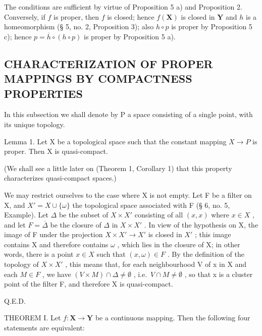 The conditions are sufficient by virtue of Proposition 5 a) and Proposition 2. Conversely, if \(f\) is proper, then \(f\) is closed; hence \(f(\mathbf{X})\) is closed in \(\mathbf{Y}\) and \(h\) is a homeomorphism (§ 5, no. 2, Proposition 3); also \(h \circ p\) is proper by Proposition 5 c); hence \(p = \overline{h} \circ (h \circ p)\) is proper by Proposition 5 a).

\subsection{CHARACTERIZATION OF PROPER MAPPINGS BY COMPACTNESS PROPERTIES}

In this subsection we shall denote by P a space consisting of a single point, with its unique topology.

Lemma 1. Let X be a topological space such that the constant mapping \(X \rightarrow P\) is proper. Then X is quasi-compact.

(We shall see a little later on (Theorem 1, Corollary 1) that this property characterizes quasi-compact spaces.)

We may restrict ourselves to the case where X is not empty. Let F be a filter on X, and \(X' = X \cup \{\omega\}\) the topological space associated with F (§ 6, no. 5, Example). Let \(\Delta\) be the subset of \(X \times X'\) consisting of all \((x, x)\) where \(x \in X\) , and let \(F = \overline{\Delta}\) be the closure of \(\Delta\) in \(X \times X'\) . In view of the hypothesis on X, the image of F under the projection \(X \times X' \to X'\) is closed in \(X'\) ; this image contains X and therefore contains \(\omega\) , which lies in the closure of X; in other words, there is a point \(x \in X\) such that \((x, \omega) \in F\) . By the definition of the topology of \(X \times X'\) , this means that, for each neighbourhood V of x in X and each \(M \in F\) , we have \((V \times M) \cap \Delta \neq \emptyset\) , i.e.~\(V \cap M \neq \emptyset\) , so that x is a cluster point of the filter F, and therefore X is quasi-compact.

Q.E.D.

THEOREM I. Let \(f: \mathbf{X} \to \mathbf{Y}\) be a continuous mapping. Then the following four statements are equivalent:

